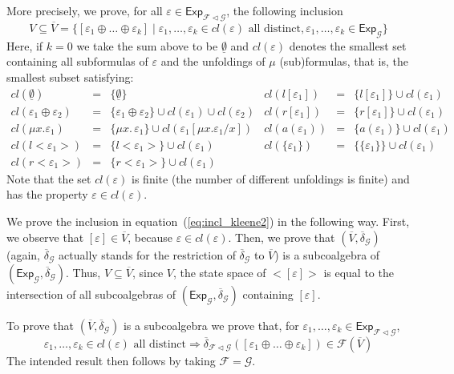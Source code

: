 \documentclass{LMCS}
\newcommand\E\varepsilon
\newcommand\Exp{\mathsf{Exp}}
\newcommand\G{\mathcal{G}}
\newcommand\F{\mathcal{F}}
\newcommand\emp{\underline\emptyset}
\theoremstyle{definition}
\theoremstyle{plain}
\theoremstyle{plain}
\theoremstyle{plain}
\theoremstyle{plain}
\theoremstyle{definition}
\theoremstyle{definition}
\begin{document}
More precisely, we prove, for all $\E \in  \Exp_{\F\lhd \G}$, the
following inclusion 
\begin{equation}\label{eq:incl_kleene2}
V \subseteq \overline V = \{[\E_1\oplus \ldots \oplus \E_k] \mid
\E_1,\ldots,\E_k \in \mathit{cl}(\E) \text{ all distinct}, \E_1,\ldots, \E_k
\in \Exp_\G\}
\end{equation}
Here,  if $k=0$ we take the sum above to be $\emp$ and $\mathit{cl}(\E)$ denotes the smallest set containing all subformulas of $\E$ and the unfoldings of $\mu$ (sub)formulas, that is, the smallest subset satisfying:
\[
\begin{array}{lcllcl}
\mathit{cl}(\emp) &= &\{\emp\}&\mathit{cl}(l[\E_1]) &=& \{l[\E_1]\}
\cup \mathit{cl}(\E_1)\\
\mathit{cl}(\E_1\oplus \E_2) &=&  \{\E_1\oplus\E_2\}\cup
\mathit{cl}(\E_1)\cup \mathit{cl}(\E_2)&\mathit{cl}(r[\E_1]) &=&
\{r[\E_1]\} \cup \mathit{cl}(\E_1)\\
\mathit{cl}(\mu x. \E_1) &=& \{\mu x.\,\E_1\}\cup \mathit{cl}(\E_1
[\mu x. \E_1/x]) & \mathit{cl}(a(\E_1)) &=& \{a(\E_1)\} \cup
\mathit{cl}(\E_1)\\
\mathit{cl}(l<\E_1>) &=& \{l<\E_1>\} \cup \mathit{cl}(\E_1)&\mathit{cl}(\{\E_1\}) &=& \{\{\E_1\}\} \cup
\mathit{cl}(\E_1)
\\
\mathit{cl}(r<\E_1>) &=& \{r<\E_1>\} \cup
\mathit{cl}(\E_1)\end{array}
\]
Note that the set $\mathit{cl}(\E)$ is finite (the number of different unfoldings is finite) and has the property $\E\in
\mathit{cl}(\E)$.

We prove the inclusion in equation~(\ref{eq:incl_kleene2}) in the following way. First,
we observe that $[\E] \in \overline V$, because $\E \in \mathit{cl}(\E)$. Then,
we prove that $(\overline V, \overline\delta_\G)$ (again, $\overline\delta_\G$
actually stands for the restriction of $\overline\delta_\G$ to $\overline V$) is a subcoalgebra of
$(\Exp_\G,\overline\delta_\G)$. Thus, $V \subseteq \overline V$, since $V$, the
state space of $<[\E]>$ is equal to the intersection of all
subcoalgebras of $(\Exp_\G,\overline\delta_\G)$ containing $[\E]$.
 
To prove that $(\overline V, \overline\delta_\G)$ is a subcoalgebra we prove
that, for $\E_1,\ldots, \E_k
\in \Exp_{\F\lhd \G}$,
\begin{equation}\label{eq:kleene2_1_5}
\E_1,\ldots,\E_k \in \mathit{cl}(\E) \text{ all distinct} \Rightarrow \overline\delta_{\F\lhd
\G}([\E_1\oplus\ldots \oplus \E_k]) \in \F(\overline V)
\end{equation}
The intended
result then follows by taking $\F=\G$.
\end{document}
